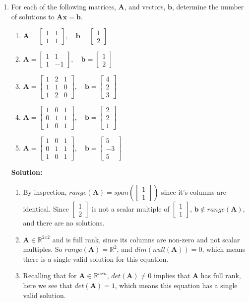 \documentclass[]{article}
\newcommand{\R}{\mathbb{R}}				%
\newcommand{\bbm}{\begin{bmatrix}}		%
\newcommand{\ebm}{\end{bmatrix}}		%
\newcommand{\x}{\bm{x}}					%
\newcommand{\A}{\bm{A}}					%
\newcommand{\solution}{\vskip 0.5cm \textbf{\large Solution:} \\}
\begin{document}
\begin{enumerate}[resume]
	\item For each of the following matrices, $\A$, and vectors, $\bm{b}$, determine the number of solutions to $\A\x=\bm{b}$.
	  \begin{enumerate}
	  \item $\A = \bbm 1&1\\1&1 \ebm,\quad \bm{b}=\bbm 1\\2\ebm$
	  \item $\A = \bbm 1&1\\1&-1\ebm,\quad \bm{b}=\bbm 1\\2\ebm$
	  \item $\A = \bbm 1 & 2 & 1 \\ 1&1&0\\1&2&0 \ebm,\quad \bm{b}=\bbm 4\\2\\3 \ebm$
	  \item $\A = \bbm 1&0&1\\0&1&1\\1&0&1 \ebm,\quad \bm{b}=\bbm 2\\2\\1 \ebm$
	  \item $\A = \bbm 1&0&1\\0&1&1\\1&0&1 \ebm,\quad \bm{b}=\bbm 5\\-3\\5 \ebm$
	  \end{enumerate}

	  \solution
	  \begin{enumerate}
	  \item By inspection, $range(\A) = span\left(\bbm 1 \\ 1 \ebm\right)$ since
        it's columns are identical. Since $\bbm 1 \\ 2 \ebm$ is not a
        scalar multiple of $\bbm 1 \\ 1 \ebm$, $\bm{b} \not\in
        range(\A)$, and there are no solutions.

      \item $\A \in \R^{2x2}$ and is full rank, since its columns are
        non-zero and not scalar multiples. So $range(\A) = \R^{2}$,
        and $dim(null(\A)) = 0$, which means there is a single valid
        solution for this equation.

      \item Recalling that for $\A \in \R^{nxn}$, $det(\A) \neq 0$
        implies that $\A$ has full rank, here we see that $det(\A) =
        1$, which means this equation has a single valid solution.


\end{enumerate}
\end{enumerate}
\end{document}
